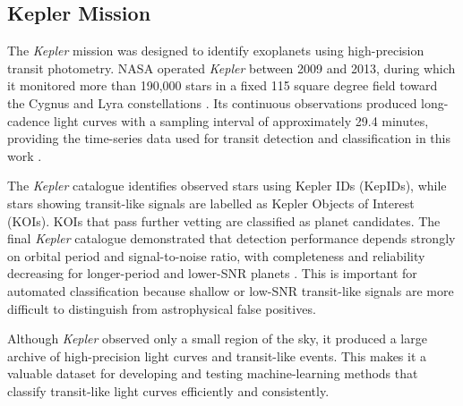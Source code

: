 \subsection{Kepler Mission}

The \textit{Kepler} mission was designed to identify exoplanets using high-precision transit photometry. NASA operated \textit{Kepler} between 2009 and 2013, during which it monitored more than 190,000 stars in a fixed 115 square degree field toward the Cygnus and Lyra constellations \citep{Kepler_Mission, 2016ApJS..224...12C}. Its continuous observations produced long-cadence light curves with a sampling interval of approximately 29.4 minutes, providing the time-series data used for transit detection and classification in this work \citep{Borucki_2010_Kepler}.

The \textit{Kepler} catalogue identifies observed stars using Kepler IDs (KepIDs), while stars showing transit-like signals are labelled as Kepler Objects of Interest (KOIs). KOIs that pass further vetting are classified as planet candidates. The final \textit{Kepler} catalogue demonstrated that detection performance depends strongly on orbital period and signal-to-noise ratio, with completeness and reliability decreasing for longer-period and lower-SNR planets \citep{2018ApJS..235...38T}. This is important for automated classification because shallow or low-SNR transit-like signals are more difficult to distinguish from astrophysical false positives.

Although \textit{Kepler} observed only a small region of the sky, it produced a large archive of high-precision light curves and transit-like events. This makes it a valuable dataset for developing and testing machine-learning methods that classify transit-like light curves efficiently and consistently.

